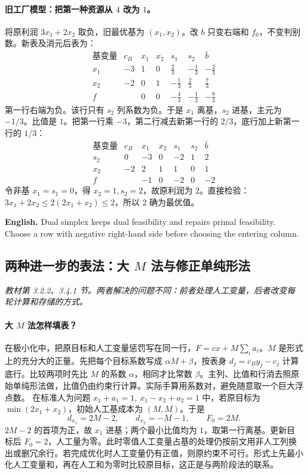 \documentclass[UTF8,11pt,a4paper]{ctexart}
\newcommand{\EN}[1]{\par\noindent \textbf{English.} #1\par}
\begin{document}
\paragraph{旧工厂模型：把第一种资源从 $4$ 改为 $1$。}
将原利润 $3x_1+2x_2$ 取负，旧最优基为 $(x_1,x_2)$。改 $b$ 只变右端和 $f_0$，不变判别数。新表及消元后表为：
\[
\begin{array}{c|r|rrrr|r}
\text{基变量}&c_B&x_1&x_2&s_1&s_2&\bar b\\\hline
x_1&-3&1&0&\frac{2}{3}&-\frac{1}{3}&-\frac{2}{3}\\
x_2&-2&0&1&-\frac{1}{3}&\frac{2}{3}&\frac{7}{3}\\
\hline
f&&0&0&-\frac{4}{3}&-\frac{1}{3}&-\frac{8}{3}
\end{array}
\]
第一行右端为负。该行只有 $s_2$ 列系数为负。于是 $x_1$ 离基，$s_2$ 进基，主元为 $-1/3$。比值是 $1$。把第一行乘 $-3$，第二行减去新第一行的 $2/3$，底行加上新第一行的 $1/3$：
\[
\begin{array}{c|r|rrrr|r}
\text{基变量}&c_B&x_1&x_2&s_1&s_2&\bar b\\\hline
s_2&0&-3&0&-2&1&2\\
x_2&-2&2&1&1&0&1\\
\hline
f&&-1&0&-2&0&-2
\end{array}
\]
令非基 $x_1=s_1=0$，得 $x_2=1,s_2=2$，故原利润为 $2$。直接检验：$3x_1+2x_2\le2(2x_1+x_2)\le2$，所以 $2$ 确为最优值。
\EN{Dual simplex keeps dual feasibility and repairs primal feasibility. Choose a row with negative right-hand side before choosing the entering column.}
\clearpage
\subsection*{两种进一步的表法：大 $M$ 法与修正单纯形法}
\noindent\textit{教材第 3.2.2、3.4.1 节。两者解决的问题不同：前者处理人工变量，后者改变每轮计算和存储的方式。}
\paragraph{大 $M$ 法怎样填表？}
在极小化中，把原目标和人工变量惩罚写在同一行，$F=cx+M\sum_i a_i$。$M$ 是形式上的充分大的正量。先把每个目标系数写成 $\alpha M+\beta$，按表身 $d_j=c_By_j-c_j$ 计算底行。比较两项时先比 $M$ 的系数 $\alpha$，相同才比常数 $\beta$。主列、比值和行消去照原始单纯形法做，比值仍由约束行计算。实际手算用系数对，避免随意取一个巨大浮点数。
在标准人为问题 $x_1+a_1=1,\ x_1-x_2+a_2=1$ 中，若原目标为 $\min(2x_1+x_2)$，初始人工基成本为 $(M,M)$。于是
\[
 d_{x_1}=2M-2,\qquad d_{x_2}=-M-1,\qquad F_0=2M.
\]
$2M-2$ 的首项为正，故 $x_1$ 进基；两个最小比值均为 $1$，取第一行离基。更新目标后 $F_0=2$，人工量为零。此时零值人工变量占基的处理仍按前文用非人工列换出或删冗余行。若完成优化时人工变量仍有正值，则原约束不可行。形式上先最小化人工变量和，再在人工和为零时比较原目标，这正是与两阶段法的联系。
\end{document}
